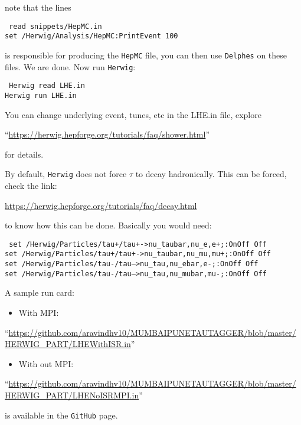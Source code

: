note that the lines
\begin{center}
    \begin{minipage}{0.7\textwidth}
        {\tt
            read snippets/HepMC.in\\
            set /Herwig/Analysis/HepMC:PrintEvent 100
        }
    \end{minipage}
\end{center}
is responsible for producing the {\tt HepMC} file, you can then use {\tt Delphes} on these files. We are done. Now run {\tt Herwig}:
\begin{center}
    \begin{minipage}{0.7\textwidth}
        {\tt
            Herwig read LHE.in\\
            Herwig run LHE.in
        }
    \end{minipage}
\end{center}
You can change underlying event, tunes, etc in the LHE.in file, explore 
\begin{flushleft}
    ``\small{\url{https://herwig.hepforge.org/tutorials/faq/shower.html}}''
\end{flushleft}
for details.

By default, {\tt Herwig} does not force $\tau$ to decay hadronically. This can be forced, check the link: 
\begin{flushleft}
    \small{\url{https://herwig.hepforge.org/tutorials/faq/decay.html}}
\end{flushleft}
to know how this can be done. Basically you would need:
\begin{center}
    \begin{minipage}{0.8\textwidth}
        {\tt
            set /Herwig/Particles/tau+/tau+->nu\_taubar,nu\_e,e+;:OnOff Off\\
            set /Herwig/Particles/tau+/tau+->nu\_taubar,nu\_mu,mu+;:OnOff Off\\
            set /Herwig/Particles/tau-/tau-->nu\_tau,nu\_ebar,e-;:OnOff Off\\
            set /Herwig/Particles/tau-/tau-->nu\_tau,nu\_mubar,mu-;:OnOff Off
        }
    \end{minipage}
\end{center}

A sample run card:
\begin{itemize}
    \item With MPI:
\end{itemize}
\begin{flushleft}
    ``\small{\url{https://github.com/aravindhv10/MUMBAIPUNETAUTAGGER/blob/master/HERWIG_PART/LHEWithISR.in}}''
\end{flushleft}
\begin{itemize}
    \item With out MPI:
\end{itemize}
\begin{flushleft}
    ``\small{\url{https://github.com/aravindhv10/MUMBAIPUNETAUTAGGER/blob/master/HERWIG_PART/LHENoISRMPI.in}}''
\end{flushleft}
is available in the {\tt GitHub} page.

